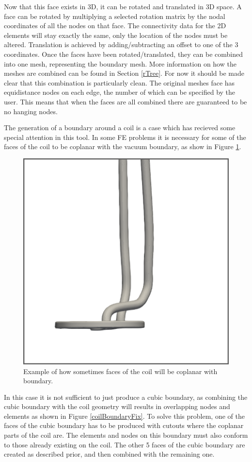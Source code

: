 \documentclass[12pt, letterpaper]{article}
\begin{document}
Now that this face exists in 3D, it can be rotated and translated in 3D space. A face can be rotated by multiplying a selected rotation matrix by the nodal coordinates of all the nodes on that face. The connectivity data for the 2D elements will stay exactly the same, only the location of the nodes must be altered. Translation is achieved by adding/subtracting an offset to one of the 3 coordinates. Once the faces have been rotated/translated, they can be combined into one mesh, representing the boundary mesh. More information on how the meshes are combined can be found in Section \ref{rTree}. For now it should be made clear that this combination is particularly clean. The original meshes face has equidistance nodes on each edge, the number of which can be specified by the user. This means that when the faces are all combined there are guaranteed to be no hanging nodes.

The generation of a boundary around a coil is a case which has recieved some special attention in this tool. In some FE problems it is necessary for some of the faces of the coil to be coplanar with the vacuum boundary, as show in Figure \ref{coplanarCoilFig}. 

\begin{figure}
\begin{center}
\includegraphics[width=0.5\linewidth]{coplanarCoil.png}
\end{center}
\caption{Example of how sometimes faces of the coil will be coplanar with boundary.}
\label{coplanarCoilFig}
\end{figure}

In this case it is not sufficient to just produce a cubic boundary, as combining the cubic boundary with the coil geometry will results in overlapping nodes and elements as shown in Figure \ref{coilBoundaryFix}. To solve this problem, one of the faces of the cubic boundary has to be produced with cutouts where the coplanar parts of the coil are. The elements and nodes on this boundary must also conform to those already existing on the coil. The other 5 faces of the cubic boundary are created as described prior, and then combined with the remaining one.
\end{document}
